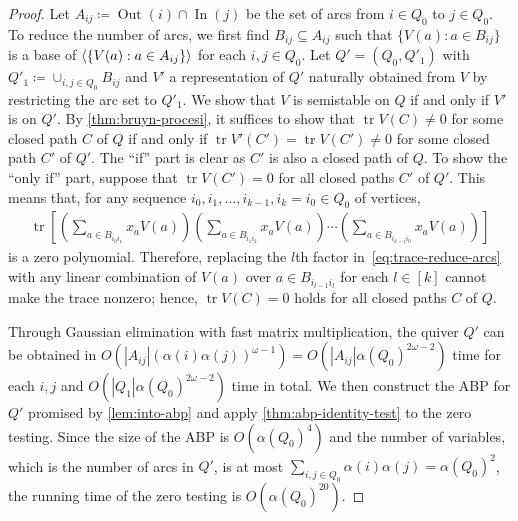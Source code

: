 \documentclass[a4paper,11pt]{article}
\numberwithin{equation}{section}
\DeclareMathOperator{\In}{In}
\DeclareMathOperator{\Out}{Out}
\DeclareMathOperator{\tr}{tr}
\DeclarePairedDelimiter{\spnn}{\langle}{\rangle}
\begin{document}
\begin{proof}
    Let $A_{ij} \coloneqq \Out(i) \cap \In(j)$ be the set of arcs from $i \in Q_0$ to $j \in Q_0$.
    To reduce the number of arcs, we first find $B_{ij} \subseteq A_{ij}$ such that $\{V(a) : a \in B_{ij}\}$ is a base of $\spnn{\{V(a) : a \in A_{ij}\}}$ for each $i, j \in Q_0$.
    Let $Q' = (Q_0, Q'_1)$ with $Q'_1 \coloneqq \cup_{i,j \in Q_0} B_{ij}$ and $V'$ a representation of $Q'$ naturally obtained from $V$ by restricting the arc set to $Q'_1$.
    We show that $V$ is semistable on $Q$ if and only if $V'$ is on $Q'$.
    By \cref{thm:bruyn-procesi}, it suffices to show that $\tr V(C) \ne 0$ for some closed path $C$ of $Q$ if and only if $\tr V'(C') = \tr V(C') \ne 0$ for some closed path $C'$ of $Q'$.
    The ``if'' part is clear as $C'$ is also a closed path of $Q$.
    To show the ``only if'' part, suppose that $\tr V(C') = 0$ for all closed paths $C'$ of $Q'$.
    This means that, for any sequence $i_0, i_1, \dotsc, i_{k-1}, i_k = i_0 \in Q_0$ of vertices,
    \begin{align}\label{eq:trace-reduce-arcs}
        \tr \left[ \left( \sum_{a \in B_{i_0 i_1}} x_a V(a) \right)
        \left( \sum_{a \in B_{i_1 i_2}} x_a V(a) \right)
        \dotsm
        \left( \sum_{a \in B_{i_{k-1} i_0}} x_a V(a) \right) \right]
    \end{align}
    is a zero polynomial.
    Therefore, replacing the $l$th factor in~\eqref{eq:trace-reduce-arcs} with any linear combination of $V(a)$ over $a \in B_{i_{l-1} i_l}$ for each $l \in [k]$ cannot make the trace nonzero; hence, $\tr V(C) = 0$ holds for all closed paths $C$ of $Q$.

    Through Gaussian elimination with fast matrix multiplication, the quiver $Q'$ can be obtained in $O(|A_{ij}|{(\alpha(i)\alpha(j))}^{\omega - 1}) = O(|A_{ij}|{\alpha(Q_0)}^{2\omega - 2})$ time for each $i, j$ and $O(|Q_1| {\alpha(Q_0)}^{2\omega - 2})$ time in total. 
    We then construct the ABP for $Q'$ promised by \cref{lem:into-abp} and apply \cref{thm:abp-identity-test} to the zero testing.
    Since the size of the ABP is $O({\alpha(Q_0)}^4)$ and the number of variables, which is the number of arcs in $Q'$, is at most $\sum_{i,j \in Q_0} \alpha(i) \alpha(j) = {\alpha(Q_0)}^2$, the running time of the zero testing is $O({\alpha(Q_0)}^{20})$.
\end{proof}
\end{document}
